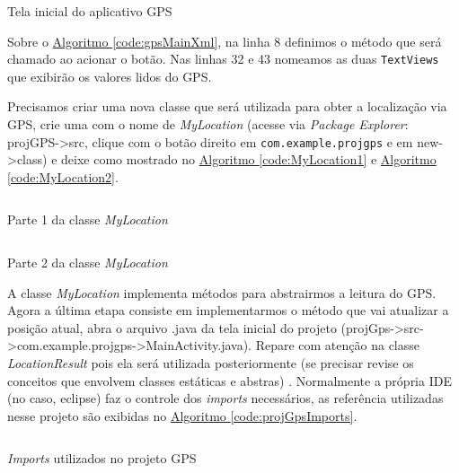 \documentclass[a4paper,12pt,brazil,oneside]{book}
\begin{document}
		\begin{listing}[H]
		\inputminted[linenos=true,fontsize=\small,frame=lines, framesep=2mm, tabsize=2,numbersep=5pt]{xml}{src/api/maps/gpsMainXml.xml}
		\caption{Tela inicial do aplicativo GPS}
		\label{code:gpsMainXml}
		\end{listing} 
		
		Sobre o \hyperref[code:gpsMainXml]{Algoritmo \ref*{code:gpsMainXml}}, na linha 8 definimos o método que será chamado ao acionar o botão. Nas linhas 32 e 43 nomeamos as duas \texttt{TextViews} que exibirão os valores lidos do GPS.
		
		Precisamos criar uma nova classe que será utilizada para obter a localização via GPS, crie uma com o nome de \emph{MyLocation} (acesse via \emph{Package Explorer}: projGPS->src, clique com o botão direito em \texttt{com.example.projgps} e em new->class) e deixe como mostrado no \hyperref[code:MyLocation1]{Algoritmo \ref*{code:MyLocation1}} e \hyperref[code:MyLocation2]{Algoritmo \ref*{code:MyLocation2}}.
		
		\begin{listing}[H]
		\inputminted[linenos=true,fontsize=\small,frame=lines, framesep=2mm, tabsize=2,numbersep=5pt]{xml}{src/api/maps/MyLocation1.java}
		\caption{Parte 1 da classe \emph{MyLocation}}
		\label{code:MyLocation1}
		\end{listing}
		
		\begin{listing}[H]
		\inputminted[linenos=true,fontsize=\small,frame=lines, framesep=2mm, tabsize=2,numbersep=5pt]{xml}{src/api/maps/MyLocation2.java}
		\caption{Parte 2 da classe \emph{MyLocation}}
		\label{code:MyLocation2}
		\end{listing}
		
		A classe \emph{MyLocation} implementa métodos para abstrairmos a leitura do GPS. Agora a última etapa consiste em implementarmos o método que vai atualizar a posição atual, abra o arquivo .java da tela inicial do projeto (projGps->src->com.example.projgps->MainActivity.java). Repare com atenção na classe \emph{LocationResult} pois ela será utilizada posteriormente (se precisar revise os conceitos que envolvem classes estáticas e abstras) . Normalmente a própria IDE (no caso, eclipse) faz o controle dos \emph{imports} necessários, as referência utilizadas nesse projeto são exibidas no \hyperref[code:projGpsImports]{Algoritmo \ref*{code:projGpsImports}}.
		
		\begin{listing}[H]
		\inputminted[linenos=true,fontsize=\small,frame=lines, framesep=2mm, tabsize=2,numbersep=5pt]{xml}{src/api/maps/gpsMainImports.java}
		\caption{\emph{Imports} utilizados no projeto GPS}
		\label{code:projGpsImports}
		\end{listing}
		
\end{document}
